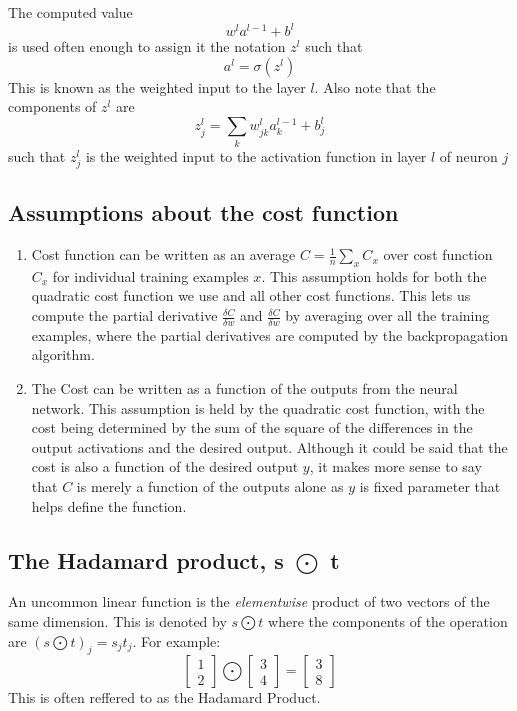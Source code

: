 \documentclass[a4paper,12pt]{article}
\begin{document}
The computed value $$w^la^{l-1}+b^l$$ is used often enough to assign it the notation $z^l$ such that $$a^l=\sigma (z^l)$$ This is known as the weighted input to the layer $l$. Also note that the components of $z^l$ are $$z^l_j=\sum_kw^l_{jk}a^{l-1}_k+b^l_j$$ such that $z^l_j$ is the weighted input to the activation function in layer $l$ of neuron $j$

\subsection{Assumptions about the cost function}
\begin{enumerate}
	\item Cost function can be written as an average $C = \frac{1}{n}\sum_xC_x$ over cost function $C_x$ for individual training examples $x$. This assumption holds for both the quadratic cost function we use and all other cost functions.
		This lets us compute the partial derivative $\frac{\delta C}{\delta w}$ and $\frac{\delta C}{\delta w}$ by averaging over all the training examples, where the partial derivatives are computed by the backpropagation algorithm.
	\item The Cost can be written as a function of the outputs from the neural network. This assumption is held by the quadratic cost function, with the cost being determined by the sum of the square of the differences in the output activations and the desired output. Although it could be said that the cost is also a function of the desired output $y$, it makes more sense to say that $C$ is merely a function of the outputs alone as $y$ is fixed parameter that helps define the function.
\end{enumerate}

\subsection{The Hadamard product, s $\bigodot$ t}
An uncommon linear function is the \textit{elementwise} product of two vectors of the same dimension. This is denoted by $s\bigodot t$ where the components of the operation are $(s \bigodot t)_j=s_jt_j$. For example: $$\left[ \begin{array}{c}1\\2\end{array} \right] \bigodot \left[ \begin{array}{c}3\\4\end{array} \right] = \left[ \begin{array}{c}3\\8\end{array} \right] $$ This is often reffered to as the Hadamard Product.
\end{document}
